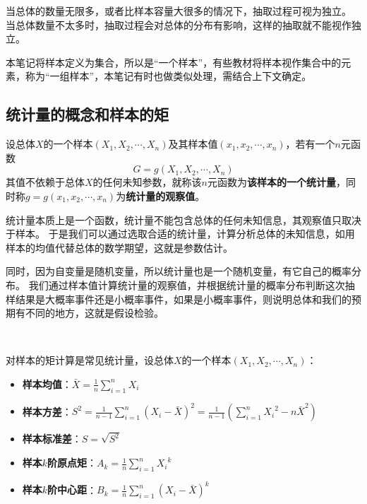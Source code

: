 当总体的数量无限多，或者比样本容量大很多的情况下，抽取过程可视为独立。
当总体数量不太多时，抽取过程会对总体的分布有影响，这样的抽取就不能视作独立。

\begin{tcolorbox}
本笔记将样本定义为集合，所以是“一个样本”，有些教材将样本视作集合中的元素，称为“一组样本”，本笔记有时也做类似处理，需结合上下文确定。
\end{tcolorbox}

\subsection{统计量的概念和样本的矩}

\begin{definition}[统计量]
设总体$X$的一个样本$\left( X_1,X_2,\cdots ,X_n \right) $及其样本值$\left( x_1,x_2,\cdots ,x_n \right) $，若有一个$n$元函数
\[
G=g\left( X_1,X_2,\cdots ,X_n \right)
\]
其值不依赖于总体$X$的任何未知参数，就称该$n$元函数为{\bf 该样本的一个统计量}，同时称$g=g\left( x_1,x_2,\cdots ,x_n \right) $为{\bf 统计量的观察值}。
\end{definition}

统计量本质上是一个函数，统计量不能包含总体的任何未知信息，其观察值只取决于样本。
于是我们可以通过选取合适的统计量，计算分析总体的未知信息，如用样本的均值代替总体的数学期望，这就是参数估计。

同时，因为自变量是随机变量，所以统计量也是一个随机变量，有它自己的概率分布。
我们通过样本值计算统计量的观察值，并根据统计量的概率分布判断这次抽样结果是大概率事件还是小概率事件，如果是小概率事件，则说明总体和我们的预期有不同的地方，这就是假设检验。

~

对样本的矩计算是常见统计量，设总体$X$的一个样本$\left( X_1,X_2,\cdots ,X_n \right) $：
\begin{itemize}
    \item {\bf 样本均值}：$\bar{X}=\frac{1}{n}\sum_{i=1}^n{X_i}$
    \item {\bf 样本方差}：$S^2=\frac{1}{n-1}\sum_{i=1}^n{\left( X_i-\bar{X} \right) ^2}=\frac{1}{n-1}\left( \sum_{i=1}^n{{X_i}^2}-n\bar{X}^2 \right) $
    \item {\bf 样本标准差}：$S=\sqrt{S^2}$
    \item {\bf 样本$k$阶原点矩}：$A_k=\frac{1}{n}\sum_{i=1}^n{{X_i}^k}$
    \item {\bf 样本$k$阶中心距}：$B_k=\frac{1}{n}\sum_{i=1}^n{\left( X_i-\bar{X} \right) ^k}$
\end{itemize}

